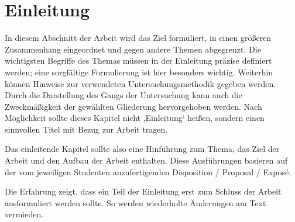 \documentclass[11pt]{scrartcl}
\begin{document}
\onehalfspacing

\setcounter{page}{1}

\clearpairofpagestyles

\lohead{\rightmark}


\rehead{\pagemark}
\rohead{\pagemark}

%
% 

\section{Einleitung}
In diesem Abschnitt der Arbeit wird das Ziel formuliert, in einen größeren Zusammenhang eingeordnet und gegen andere Themen abgegrenzt. Die wichtigsten Begriffe des Themas müssen in der Einleitung präzise definiert werden; eine sorgfältige Formulierung ist hier besonders wichtig. Weiterhin können Hinweise zur verwendeten Untersuchungsmethodik gegeben werden. Durch die Darstellung des Gangs der Untersuchung kann auch die Zweckmäßigkeit der gewählten Gliederung hervorgehoben werden.  Nach Möglichkeit sollte dieses Kapitel nicht ‚Einleitung‘ heißen, sondern einen sinnvollen Titel mit Bezug zur Arbeit tragen.

Das einleitende Kapitel sollte also eine Hinführung zum Thema, das Ziel der Arbeit und den Aufbau der Arbeit enthalten. Diese Ausführungen basieren auf der vom jeweiligen Studenten anzufertigenden Disposition / Proposal / Exposé.

Die Erfahrung zeigt, dass ein Teil der Einleitung erst zum Schluss der Arbeit ausformuliert  werden sollte. So werden wiederholte Änderungen am Text vermieden.
\end{document}
